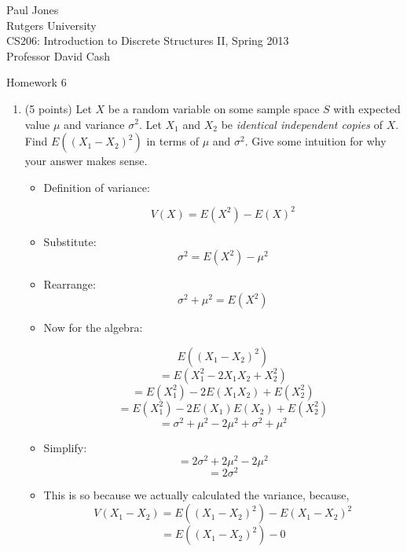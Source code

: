 \documentclass[11pt]{article}
\begin{document}
\sloppy

\noindent Paul Jones \\
Rutgers University\\
CS206: Introduction to Discrete Structures II, Spring 2013\\
Professor David Cash\\

\begin{center}
Homework 6 \\
\end{center}

\vspace{.1in}

\begin{enumerate}

\item (5 points) Let $X$ be a random variable on some sample space $S$ with
expected value $\mu$ and variance $\sigma^2$.  Let $X_1$ and
$X_2$ be \emph{identical independent copies} of $X$.  Find
$E((X_1 - X_2)^2)$ in terms of $\mu$ and $\sigma^2$.  Give some intuition for why your answer makes sense. 


       
	\begin{itemize}
	
		\item Definition of variance:
		
			  \[V(X) = E(X^2) - E(X)^2 \]
		\item Substitute:
			  \[\sigma^2 = E(X^2) - \mu^2 \]
		\item Rearrange:
			  \[\sigma^2 + \mu^2= E(X^2)  \]
		\item Now for the algebra:
		
		      \[   E((X_1 - X_2)^2) \]
		      \[ = E(X_1^2 - 2 X_1 X_2 + X_2^2) \]
		      \[ = E(X_1^2) - 2E(X_1 X_2) + E(X_2^2) \]
		      \[ = E(X_1^2) - 2E(X_1)E(X_2) + E(X_2^2) \]
              \[ = \sigma^2 + \mu^2 - 2\mu^2 + \sigma^2 + \mu^2 \]
        \item Simplify:
              \[ = 2\sigma^2 + 2\mu^2 - 2\mu^2 \]
              \[ = 2\sigma^2 \]
        
        \item This is so because we actually calculated the variance, because,
        		  \[V(X_1 - X_2) = E((X_1 - X_2)^2) - E(X_1 - X_2)^2 \]
		      \[= E((X_1 - X_2)^2) - 0 \]
	  

\end{itemize}
\end{enumerate}
\end{document}
